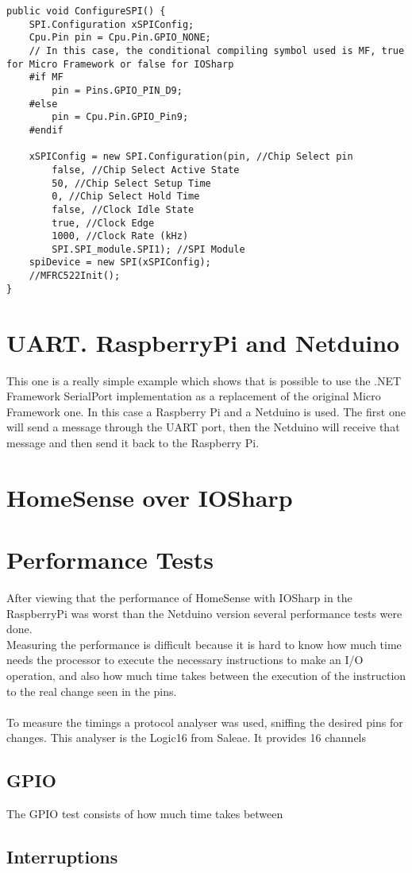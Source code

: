 \begin{lstlisting}[language=CSharp, caption={SPIApi.cs - Conditional compiling symbol for NETMF and IOSharp}]
public void ConfigureSPI() {
    SPI.Configuration xSPIConfig;
    Cpu.Pin pin = Cpu.Pin.GPIO_NONE;
  	// In this case, the conditional compiling symbol used is MF, true for Micro Framework or false for IOSharp
  	#if MF
    	pin = Pins.GPIO_PIN_D9;
    #else
        pin = Cpu.Pin.GPIO_Pin9;
    #endif

    xSPIConfig = new SPI.Configuration(pin, //Chip Select pin
        false, //Chip Select Active State
        50, //Chip Select Setup Time
        0, //Chip Select Hold Time
        false, //Clock Idle State
        true, //Clock Edge
        1000, //Clock Rate (kHz)
        SPI.SPI_module.SPI1); //SPI Module
    spiDevice = new SPI(xSPIConfig);
    //MFRC522Init();
}
\end{lstlisting}
 
\section{UART. RaspberryPi and Netduino}\label{S:IOEx-UART}
This one is a really simple example which shows that is possible to use the .NET Framework SerialPort implementation as a replacement of the original Micro Framework one. In this case a Raspberry Pi and a Netduino is used. The first one will send a message through the UART port, then the Netduino will receive that message and then send it back to the Raspberry Pi.

\section{HomeSense over IOSharp}\label{S:HomeSense-IOSharp}

\section{Performance Tests}\label{S:IOEx-Performance-Tests}
After viewing that the performance of HomeSense with IOSharp in the RaspberryPi was worst than the Netduino version several performance tests were done.
\\
Measuring the performance is difficult because it is hard to know how much time needs the processor to execute the necessary instructions to make an I/O operation, and also how much time takes between the execution of the instruction to the real change seen in the pins.
\\
\\
To measure the timings a protocol analyser was used, sniffing the desired pins for changes. This analyser is the Logic16 from Saleae. It provides 16 channels 

\subsection{GPIO}\label{SS:IOEx-GPIO}
The GPIO test consists of how much time takes between

\subsection{Interruptions}
\label{SS:IOEx-Interruptions}